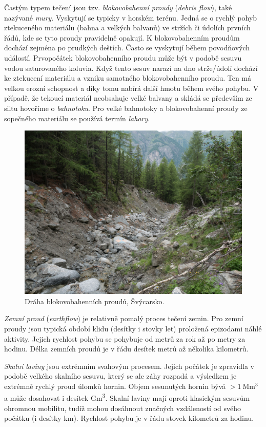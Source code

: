 \label{blokovo}
Častým typem tečení jsou tzv. \emph{blokovobahenní proudy} (\textit{debris flow}), také nazývané \emph{mury}. Vyskytují se typicky v horském terénu. Jedná se o rychlý pohyb ztekuceného materiálu (bahna a velkých balvanů) ve stržích či údolích prvních řádů, kde se tyto proudy pravidelně opakují. K blokovobahenním proudům dochází zejména po prudkých deštích. Často se vyskytují během povodňových událostí. Prvopočátek blokovobahenního proudu může být v podobě sesuvu vodou saturovaného koluvia. Když tento sesuv narazí na dno strže/údolí dochází ke ztekucení materiálu a vzniku samotného blokovobahenního proudu. Ten má velkou erozní schopnost a díky tomu nabírá další hmotu během svého pohybu.  V případě, že tekoucí materiál neobsahuje velké balvany a skládá se především ze siltu hovoříme o \emph{bahnotoku}. Pro velké bahnotoky a blokovobahenní proudy ze sopečného materiálu se používá termín \emph{lahary}.

\begin{figure}
	\centering
	\includegraphics[width=1\linewidth]{obrazky/slope/debris_flow}
	\caption{Dráha blokovobahenních proudů, Švýcarsko.}
	\label{fig:debrisflow}
\end{figure}


\emph{Zemní proud} (\textit{earthflow}) je relativně pomalý proces tečení zemin. Pro zemní proudy jsou typická období klidu (desítky i stovky let) proložená epizodami náhlé aktivity. Jejich rychlost pohybu se pohybuje od metrů za rok až po metry za hodinu. Délka zemních proudů je v řádu desítek metrů až několika kilometrů.

\emph{Skalní laviny} jsou extrémním svahovým procesem. Jejich počátek je zpravidla v podobě velkého skalního sesuvu, který se ale záhy rozpadá a výsledkem je extrémně rychlý proud úlomků hornin. Objem sesunutých hornin bývá $> \SI{1}{\mega\metre\cubed}$ a může dosahovat i desítek \si{\giga\metre\cubed}.
Skalní laviny mají oproti klasickým sesuvům ohromnou mobilitu, tudíž mohou dosáhnout značných vzdáleností od svého počátku (i desítky \si{\kilo\metre}). Rychlost pohybu je v řádu stovek kilometrů za hodinu.

